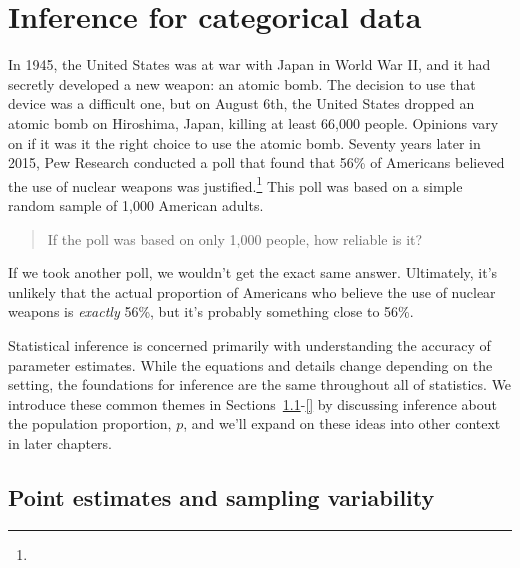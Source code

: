 
\chapter{Inference for categorical data}
\label{inferenceForCategoricalData}



In 1945, the United States was at war with Japan in World War II, and
it had secretly developed a new weapon: an atomic bomb. The decision
to use that device was a difficult one, but on August 6th, the United
States dropped an atomic bomb on Hiroshima, Japan, killing at least
66,000 people. Opinions vary on if it was it the right choice to use
the atomic bomb. Seventy years later in 2015, Pew Research conducted
a poll that found that 56\% of Americans believed the use of nuclear
weapons was justified.\footnote{
}
This poll was based on a simple random sample of 1,000 American
adults.
\begin{quote}
If the poll was based on only 1,000 people, how reliable is it?
\end{quote}
If we took another poll, we wouldn't get the exact same answer.
Ultimately, it's unlikely that the actual proportion of Americans
who believe the use of nuclear weapons is \emph{exactly} 56\%,
but it's probably something close to 56\%.

Statistical inference is concerned primarily with understanding the
accuracy of parameter estimates. While the equations and details change
depending on the setting, the foundations for inference are the same
throughout all of statistics. We introduce these common themes in
Sections~\ref{pointEstimates}-\ref{} by discussing inference about the
population proportion, $p$, and we'll expand on these ideas into other
context in later chapters.


\section[Point estimates and sampling variability]{Point
    estimates and sampling variability} %
\label{pointEstimates}

